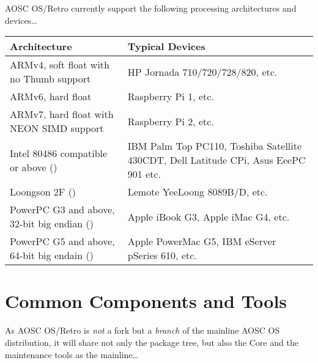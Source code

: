     AOSC OS/Retro currently support the following processing architectures and devices\ldots

    \begin{longtabu} {XX}
        {Architecture} &
        {Typical Devices}\\
        \hline
        {ARMv4, soft float with no Thumb support}
            & {HP Jornada 710/720/728/820, etc.}\\
        {ARMv6, hard float}
            & {Raspberry Pi 1, etc.}\\
        {ARMv7, hard float with NEON SIMD support}
            & {Raspberry Pi 2, etc.}\\
        {Intel 80486 compatible or above ()}
            & {IBM Palm Top PC110, Toshiba Satellite 430CDT, Dell Latitude CPi, Asus EeePC 901 etc.}\\
        {Loongson 2F ()}
            & {Lemote YeeLoong 8089B/D, etc.}\\
        {PowerPC G3 and above, 32-bit big endian ()}
            & {Apple iBook G3, Apple iMac G4, etc.}\\
        {PowerPC G5 and above, 64-bit big endain ()}
            & {Apple PowerMac G5, IBM eServer pSeries 610, etc.}\\
        \hline
    \end{longtabu}

    \section{Common Components and Tools}
    
    As AOSC OS/Retro is \textit{not} a fork but a \textit{branch} of the mainline AOSC OS distribution,
    it will share not only the package tree, but also the Core and the maintenance tools as the mainline\ldots
    
